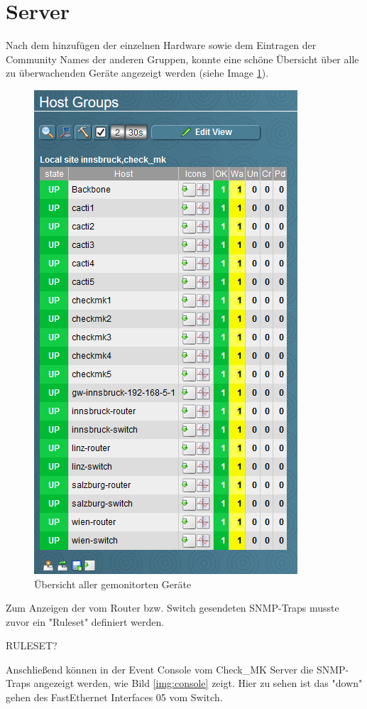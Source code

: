 \section{Server}

Nach dem hinzufügen der einzelnen Hardware sowie dem Eintragen der Community Names der anderen Gruppen, konnte eine schöne Übersicht über alle zu überwachenden Geräte angezeigt werden (siehe Image \ref{img:uebersicht}).

\begin{figure}[H]
	\centering
	\includegraphics[scale=1]{img/hostgroups.PNG}
	\caption{Übersicht aller gemonitorten Geräte}
	\label{img:uebersicht}
\end{figure}

Zum Anzeigen der vom Router bzw. Switch gesendeten \ac{SNMP}-Traps musste zuvor ein "Ruleset" definiert werden. 

RULESET?

Anschließend können in der Event Console vom Check\_MK Server die \ac{SNMP}-Traps angezeigt werden, wie Bild \ref{img:console} zeigt. Hier zu sehen ist das "down" gehen des FastEthernet Interfaces  05 vom Switch.

